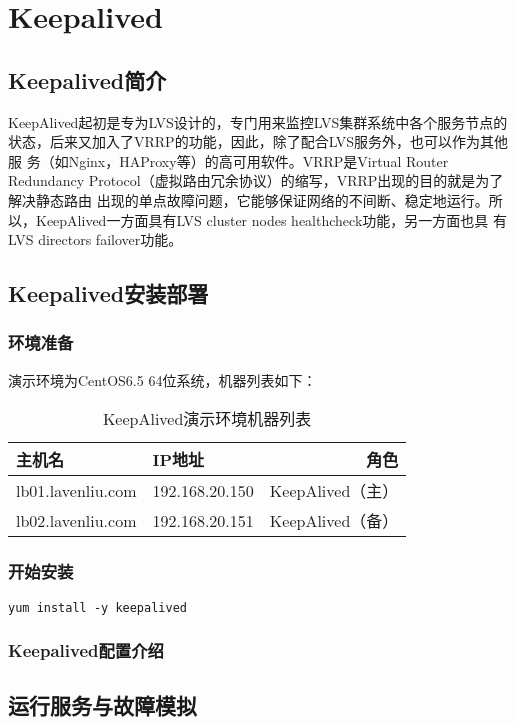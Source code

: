 \chapter{Keepalived}
\label{chap:keepalived}

\section{Keepalived简介}

KeepAlived起初是专为LVS设计的，专门用来监控LVS集群系统中各个服务节点的
状态，后来又加入了VRRP的功能，因此，除了配合LVS服务外，也可以作为其他服
务（如Nginx，HAProxy等）的高可用软件。VRRP是Virtual Router Redundancy
Protocol（虚拟路由冗余协议）的缩写，VRRP出现的目的就是为了解决静态路由
出现的单点故障问题，它能够保证网络的不间断、稳定地运行。所
以，KeepAlived一方面具有LVS cluster nodes healthcheck功能，另一方面也具
有LVS directors failover功能。

\section{Keepalived安装部署}

\subsection{环境准备}

演示环境为CentOS6.5 64位系统，机器列表如下：

\begin{table}[!htbp]
  \centering
  \caption{KeepAlived演示环境机器列表}
  \begin{tabular}{|l|l|r|}
    \hline
    主机名  & IP地址 & 角色 \\
    \hline
    lb01.lavenliu.com & 192.168.20.150 & KeepAlived（主） \\
    \hline
    lb02.lavenliu.com & 192.168.20.151 & KeepAlived（备） \\
    \hline
  \end{tabular}
\end{table}

\subsection{开始安装}

\begin{verbatim}
yum install -y keepalived
\end{verbatim}

\subsection{Keepalived配置介绍}

\section{运行服务与故障模拟}
